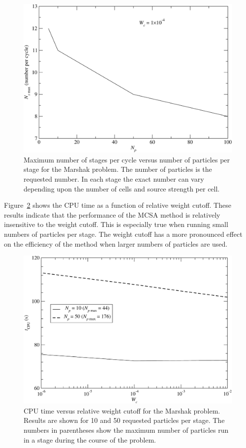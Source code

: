 \documentclass[preprint,12pt]{elsarticle}
\begin{document}
\begin{figure}[ht!]
  \centerline{ \includegraphics[width=5in,clip]{mrshk_np_Ns.pdf}}
  \caption{ Maximum number of stages per cycle versus number of
    particles per stage for the Marshak problem.  The number of
    particles is the requested number.  In each stage the exact number
    can vary depending upon the number of cells and source strength
    per cell.}
  \label{fig:CPU_Ns}
\end{figure}

Figure~\ref{fig:CPU_wc} shows the CPU time as a function of relative weight
cutoff.  These results indicate that the performance of the MCSA method is
relatively insensitive to the weight cutoff.  This is especially true when
running small numbers of particles per stage.  The weight cutoff has a more
pronounced effect on the efficiency of the method when larger numbers of
particles are used.
\begin{figure}[ht!]
  \centerline{ \includegraphics[width=5in,clip]{mrshk_wc_CPU.pdf}}
  \caption{ CPU time versus relative weight cutoff for the Marshak
    problem.  Results are shown for 10 and 50 requested particles per
    stage.  The numbers in parentheses show the maximum number of
    particles run in a stage during the course of the problem.}
  \label{fig:CPU_wc}
\end{figure}
\end{document}
